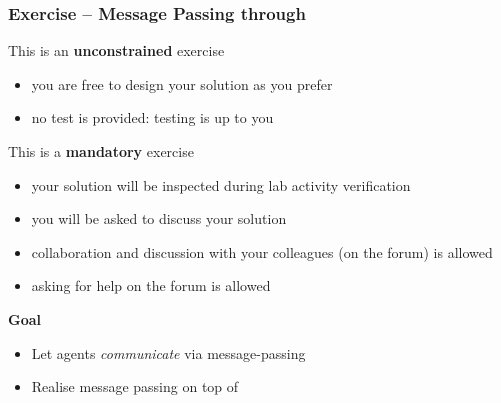 \documentclass[presentation]{beamer}\mode<presentation>{\usetheme{AMSCesenaPurpleAndGold}}
\begin{document}
\begin{frame}[allowframebreaks]
	\frametitle{Exercise \currentExercise{} -- Message Passing through \linda{}}

	\begin{alertblock}{This is an \textbf{unconstrained} exercise}
		\begin{itemize}
			\item you are free to design your solution as you prefer
			\item no test is provided: testing is up to you
		\end{itemize}
	\end{alertblock}

	\bigskip

	\begin{alertblock}{This is a \textbf{mandatory} exercise}
		\begin{itemize}
			\item your solution will be inspected during lab activity verification
			\item you will be asked to discuss your solution
			\item collaboration and discussion with your colleagues (on the forum) is allowed
			\item asking for help on the forum is allowed
		\end{itemize}
	\end{alertblock}

	\framebreak

	\begin{block}{\textbf{Goal}}
		\begin{itemize}
			\item Let agents \emph{communicate} via message-passing
			\item Realise message passing \alert{on top} of \linda{}
		\end{itemize}
	\end{block}


\end{frame}
\end{document}
